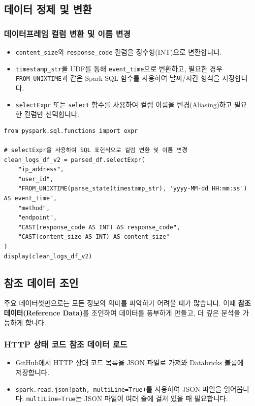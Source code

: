 \documentclass[11pt,a4paper]{article}
\theoremstyle{definition}
\begin{document}
\subsection{데이터 정제 및 변환}

\subsubsection{데이터프레임 컬럼 변환 및 이름 변경}
\begin{itemize}
    \item \texttt{content_size}와 \texttt{response_code} 컬럼을 정수형(INT)으로 변환합니다.
    \item \texttt{timestamp_str}을 UDF를 통해 \texttt{event_time}으로 변환하고, 필요한 경우 \texttt{FROM_UNIXTIME}과 같은 Spark SQL 함수를 사용하여 날짜/시간 형식을 지정합니다.
    \item \texttt{selectExpr} 또는 \texttt{select} 함수를 사용하여 컬럼 이름을 변경(Aliasing)하고 필요한 컬럼만 선택합니다.
\end{itemize}

\begin{lstlisting}[label={lst:clean_df_selectexpr}]
from pyspark.sql.functions import expr

# selectExpr을 사용하여 SQL 표현식으로 컬럼 변환 및 이름 변경
clean_logs_df_v2 = parsed_df.selectExpr(
    "ip_address",
    "user_id",
    "FROM_UNIXTIME(parse_state(timestamp_str), 'yyyy-MM-dd HH:mm:ss') AS event_time",
    "method",
    "endpoint",
    "CAST(response_code AS INT) AS response_code",
    "CAST(content_size AS INT) AS content_size"
)
display(clean_logs_df_v2)
\end{lstlisting}

\subsection{참조 데이터 조인}

\begin{conceptbox}
주요 데이터셋만으로는 모든 정보의 의미를 파악하기 어려울 때가 많습니다. 이때 \textbf{참조 데이터(Reference Data)}를 조인하여 데이터를 풍부하게 만들고, 더 깊은 분석을 가능하게 합니다.
\end{conceptbox}

\subsubsection{HTTP 상태 코드 참조 데이터 로드}
\begin{itemize}
    \item GitHub에서 HTTP 상태 코드 목록을 JSON 파일로 가져와 Databricks 볼륨에 저장합니다.
    \item \texttt{spark.read.json(path, multiLine=True)}를 사용하여 JSON 파일을 읽어옵니다. \texttt{multiLine=True}는 JSON 파일이 여러 줄에 걸쳐 있을 때 필요합니다.
\end{itemize}
\end{document}
